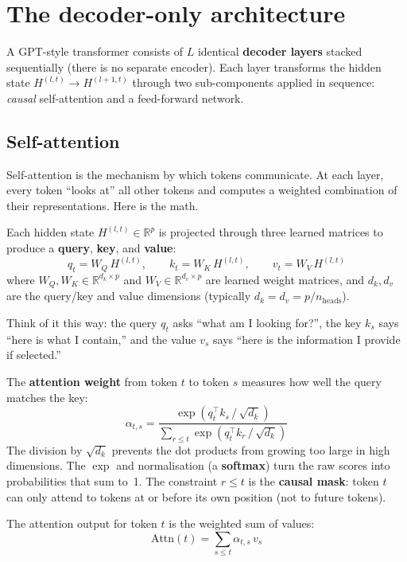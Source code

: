 \documentclass[11pt, twoside, openright]{memoir}
\begin{document}
\section{The decoder-only architecture}

A GPT-style transformer consists of $L$ identical \textbf{decoder
layers} stacked sequentially (there is no separate encoder).
Each layer transforms the hidden state $H^{(l,t)} \to H^{(l+1,t)}$
through two sub-components applied in sequence: \emph{causal}
self-attention and a feed-forward network.

\subsection*{Self-attention}

Self-attention is the mechanism by which tokens communicate.  At each
layer, every token ``looks at'' all other tokens and computes a
weighted combination of their representations.  Here is the math.

Each hidden state $H^{(l,t)} \in \mathbb{R}^p$ is projected through
three learned matrices to produce a \textbf{query}, \textbf{key}, and
\textbf{value}:
\[
  q_t = W_Q \, H^{(l,t)}, \qquad
  k_t = W_K \, H^{(l,t)}, \qquad
  v_t = W_V \, H^{(l,t)}
\]
where $W_Q, W_K \in \mathbb{R}^{d_k \times p}$ and
$W_V \in \mathbb{R}^{d_v \times p}$ are learned weight matrices, and
$d_k, d_v$ are the query/key and value dimensions
(typically $d_k = d_v = p / n_{\text{heads}}$).

Think of it this way: the query $q_t$ asks ``what am I looking for?'',
the key $k_s$ says ``here is what I contain,'' and the value $v_s$ says
``here is the information I provide if selected.''

The \textbf{attention weight} from token $t$ to token $s$ measures how
well the query matches the key:
\[
  \alpha_{t,s} = \frac{\exp(q_t^\top k_s \,/\, \sqrt{d_k})}
                      {\sum_{r \le t} \exp(q_t^\top k_r \,/\, \sqrt{d_k})}
\]
The division by $\sqrt{d_k}$ prevents the dot products from growing too
large in high dimensions.  The $\exp$ and normalisation (a
\textbf{softmax}) turn the raw scores into probabilities that sum to~1.
The constraint $r \le t$ is the \textbf{causal mask}: token $t$ can
only attend to tokens at or before its own position (not to future
tokens).

The attention output for token $t$ is the weighted sum of values:
\[
  \mathrm{Attn}(t) = \sum_{s \le t} \alpha_{t,s} \, v_s
\]
\end{document}
